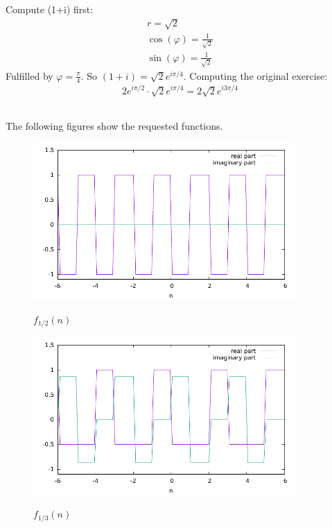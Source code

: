 \documentclass[11pt,a4paper]{scrartcl}
\begin{document}
\subsubsection{} %
Compute (1+i) first:
\begin{align}
r=\sqrt{2}\\
\cos(\varphi)=\frac{1}{\sqrt{2}}\\
\sin(\varphi)=\frac{1}{\sqrt{2}}
\end{align}
Fulfilled by $\varphi = \frac{\pi}{4}$. So $(1+i)=\sqrt{2}e^{i\pi/4}$. Computing the original exercise:
\begin{align}
2e^{i\pi/2}\cdot\sqrt{2}e^{i\pi/4}=2\sqrt{2}e^{i3\pi/4}
\end{align}
\newpage
\subsection{}
\subsubsection{}
The following figures show the requested functions.
\begin{figure}[h]
\centering
\includegraphics[width=10cm]{f2.pdf}
\label{f2}
\caption{$f_{1/2}(n)$}
\end{figure}

\begin{figure}[h]
\centering
\includegraphics[width=10cm]{f3.pdf}
\label{f3}
\caption{$f_{1/3}(n)$}
\end{figure}
\end{document}
